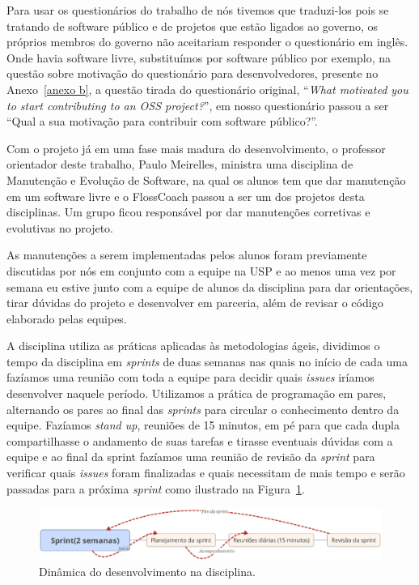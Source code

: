 Para usar os questionários do trabalho de  nós tivemos que traduzi-los pois se tratando de
software público e de projetos que estão ligados ao governo, os próprios membros 
do governo não aceitariam responder o questionário em inglês. Onde havia software 
livre, substituímos por software público por exemplo, na questão sobre motivação
do questionário para desenvolvedores, presente no Anexo~\ref{anexo b}, a questão 
tirada do questionário original, ``\textit{What motivated you to start contributing 
to an OSS project?}'', em nosso questionário passou a ser ``Qual a sua motivação para 
contribuir com software público?''.

Com o projeto já em uma fase mais madura do desenvolvimento, o professor orientador
deste trabalho, Paulo Meirelles, ministra uma disciplina de Manutenção e Evolução de
Software, na qual os alunos tem que dar manutenção em um software livre e o FlossCoach
passou a ser um dos projetos desta disciplinas. Um grupo ficou responsável por dar 
manutenções corretivas e evolutivas no projeto.

As manutenções a serem implementadas pelos alunos foram previamente discutidas
por nós em conjunto com a equipe na USP e ao menos uma vez por semana eu estive junto com a 
equipe de alunos da disciplina para dar orientações, tirar dúvidas do projeto
e desenvolver em parceria, além de revisar o código elaborado pelas equipes.
 
A disciplina utiliza as práticas aplicadas às metodologias ágeis, dividimos o tempo 
da disciplina em \textit{sprints} de duas semanas nas quais no início de cada uma 
fazíamos uma reunião com toda a equipe para decidir quais \textit{issues} iríamos 
desenvolver naquele período. Utilizamos a prática de programação em pares, alternando
os pares ao final das \textit{sprints} para circular o conhecimento dentro da equipe.
Fazíamos \textit{stand up}, reuniões de 15 minutos, em pé para que cada dupla compartilhasse
o andamento de suas tarefas e tirasse eventuais dúvidas com a equipe e ao final da sprint 
fazíamos uma reunião de revisão da \textit{sprint} para verificar quais \textit{issues} foram finalizadas e quais 
necessitam de mais tempo e serão passadas para a próxima \textit{sprint} como ilustrado na Figura~\ref{fig:disciplina}.

\begin{figure}[h]
	\centering
		\includegraphics[keepaspectratio=true,scale=0.4]{figuras/Sprint.eps}
	\caption{Dinâmica do desenvolvimento na disciplina.}
	\label{fig:disciplina}
\end{figure}

